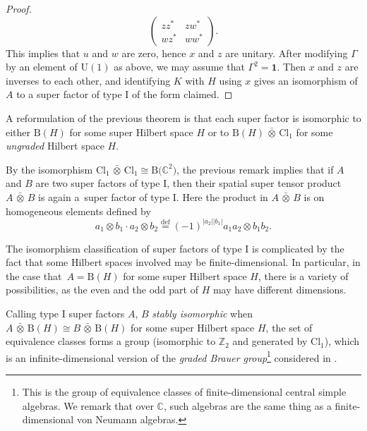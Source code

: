 \documentclass[pdftex]{sigma}
\numberwithin{equation}{section}
\newcommand{\Z}{\mathbb{Z}}
\newcommand{\C}{\mathbb{C}}
\newcommand{\B}{\mathrm{B}}
\newcommand{\Cl}{\mathrm{Cl}}
\newcommand{\U}{\mathrm{U}}
\newcommand{\defeq}{\stackrel{\mathrm{def}}{=}}
\begin{document}
\begin{proof}
\begin{equation*}
 \begin{pmatrix} zz^* & z w^* \\ wz^* & ww^* \end{pmatrix}.
 \end{equation*}
 This implies that $u$ and $w$ are zero, hence $x$ and $z$ are unitary.
 After modifying $\Gamma$ by an element of $\U(1)$ as above, we may assume that $\Gamma^2 = \mathbf{1}$.
 Then $x$ and $z$ are inverses to each other, and identifying $K$ with $H$ using $x$ gives an isomorphism of $A$ to a super factor of type I of the form claimed.
\end{proof}

\begin{Remark}
A reformulation of the previous theorem is that each super factor is isomorphic to either $\B(H)$ for some super Hilbert space $H$ or to $\B(H) \,\bar{\otimes}\, \Cl_1$ for some \emph{ungraded} Hilbert space $H$.
\end{Remark}

\begin{Remark} \label{RemarkTensorProductFactor}
By the isomorphism $\Cl_1 \,\bar{\otimes}\, \Cl_1 \cong \B\big(\C^2\big)$, the previous remark implies that if $A$ and $B$ are two super factors of type I, then their spatial super tensor product $A \,\bar{\otimes}\, B$ is again a~super factor of type I. Here the product in $A \,\bar{\otimes}\, B$ is on homogeneous elements defined by
\begin{equation*}
a_1 \otimes b_1 \cdot a_2 \otimes b_2 \defeq (-1)^{|a_2||b_1|} a_1 a_2 \otimes b_1 b_2.
\end{equation*}
\end{Remark}

\begin{Remark}
The isomorphism classification of super factors of type I is complicated by the fact that some Hilbert spaces involved may be finite-dimensional.
In particular, in the case that~$A = \B(H)$ for some super Hilbert space $H$, there is a variety of possibilities, as the even and the odd part of $H$ may have different dimensions.

Calling type I super factors $A$, $B$ \emph{stably isomorphic} when $A \,\bar{\otimes}\, \B(H) \cong B \,\bar{\otimes}\, \B(H)$ for some super Hilbert space $H$, the set of equivalence classes forms a group (isomorphic to $\Z_2$ and generated by $\Cl_1$), which is an infinite-dimensional version of the \emph{graded Brauer group}\footnote{This is the group of equivalence classes of finite-dimensional central simple algebras.
We remark that over $\C$, such algebras are the same thing as a finite-dimensional von Neumann algebras.} considered in \cite{WallGradedBrauer}.
\end{Remark}
\end{document}
